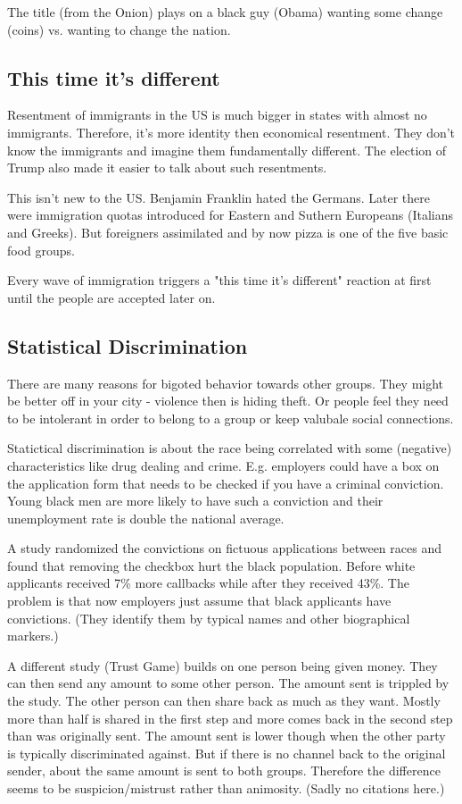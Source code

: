 \documentclass[a4paper, twocolumn]{article}
\begin{document}
The title (from the Onion) plays on a black guy (Obama) wanting some change (coins) vs. wanting to change the nation.

\subsection{This time it's different}
Resentment of immigrants in the US is much bigger in states with almost no immigrants. Therefore, it's more identity then economical resentment. They don't know the immigrants and imagine them fundamentally different. The election of Trump also made it easier to talk about such resentments.

This isn't new to the US. Benjamin Franklin hated the Germans. Later there were immigration quotas introduced for Eastern and Suthern Europeans (Italians and Greeks). But foreigners assimilated and by now pizza is one of the five basic food groups.

Every wave of immigration triggers a "this time it's different" reaction at first until the people are accepted later on.

\subsection{Statistical Discrimination}
There are many reasons for bigoted behavior towards other groups. They might be better off in your city - violence then is hiding theft. Or people feel they need to be intolerant in order to belong to a group or keep valubale social connections.

Statictical discrimination is about the race being correlated with some (negative) characteristics like drug dealing and crime. E.g. employers could have a box on the application form that needs to be checked if you have a criminal conviction. Young black men are more likely to have such a conviction and their unemployment rate is double the national average.

A study randomized the convictions on fictuous applications between races and found that removing the checkbox hurt the black population. Before white applicants received 7\% more callbacks while after they received 43\%. The problem is that now employers just assume that black applicants have convictions. (They identify them by typical names and other biographical markers.)

A different study (Trust Game) builds on one person being given money. They can then send any amount to some other person. The amount sent is trippled by the study. The other person can then share back as much as they want. Mostly more than half is shared in the first step and more comes back in the second step than was originally sent. The amount sent is lower though when the other party is typically discriminated against. But if there is no channel back to the original sender, about the same amount is sent to both groups. Therefore the difference seems to be suspicion/mistrust rather than animosity. (Sadly no citations here.)
\end{document}
